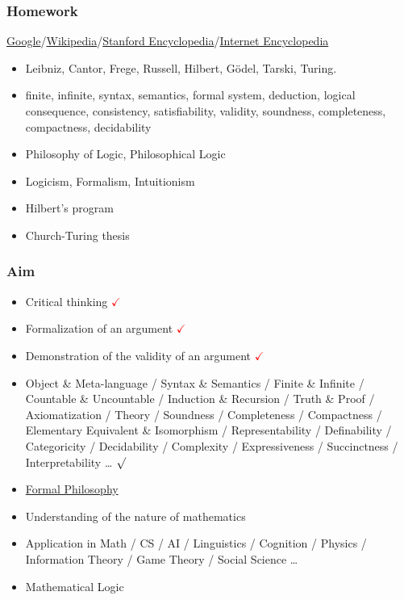 \documentclass[UTF8,aspectratio=43,11pt,colorlinks,compress,openany]{beamer}%
\begin{document}
\begin{frame}\frametitle{Homework}
		\href{https://www.google.com/}{Google}/\href{https://www.wikipedia.org/}{Wikipedia}/\href{https://plato.stanford.edu/}{Stanford Encyclopedia}/\href{https://www.iep.utm.edu/}{Internet Encyclopedia}
		\begin{itemize}
			\item Leibniz, Cantor, Frege, Russell, Hilbert, G\"odel, Tarski, Turing.
			\item finite, infinite, syntax, semantics, formal system, deduction, logical consequence, consistency, satisfiability, validity, soundness, completeness, compactness, decidability
			\item Philosophy of Logic, Philosophical Logic
			\item Logicism, Formalism, Intuitionism
			\item Hilbert's program
			\item Church-Turing thesis
		\end{itemize}
\end{frame}

\begin{frame}\frametitle{Aim}
	\begin{itemize}
		\item Critical thinking \textcolor{red}{$\checkmark$}
		\item Formalization of an argument \textcolor{red}{$\checkmark$}
		\item Demonstration of the validity of an argument \textcolor{red}{$\checkmark$}
		\item {\small Object \& Meta-language / Syntax \& Semantics / Finite \& Infinite / Countable \& Uncountable / Induction \& Recursion / Truth \& Proof / Axiomatization / Theory / Soundness / Completeness / Compactness / Elementary Equivalent \& Isomorphism / Representability / Definability / Categoricity / Decidability / Complexity / Expressiveness / Succinctness / Interpretability \dots} \textcolor{green}{$\surd$}
		\item \href{https://plato.stanford.edu/entries/formal-epistemology/}{Formal Philosophy}
		\item Understanding of the nature of mathematics
		\item Application in Math / CS / AI / Linguistics / Cognition / Physics / Information Theory / Game Theory / Social Science \dots
		\item Mathematical Logic
	\end{itemize}
\end{frame}
\end{document}
